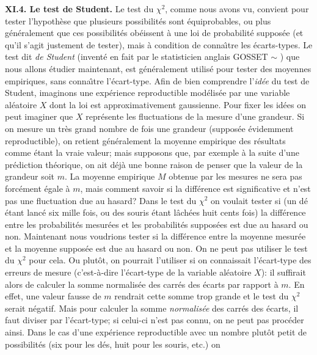 \bigskip

{\bf XI.4. Le test de Student.}
\medskip
Le test du $\chi^2$, comme nous avons vu, convient pour tester
l'hypoth\`ese que plusieurs possibilit\'es sont \'equiprobables, ou plus
g\'en\'eralement que ces possibilit\'es ob\'eissent \`a une loi de 
probabilit\'e suppos\'ee (et qu'il s'agit justement de tester), mais
\`a condition de conna{\^\i}tre les \'ecarts-types.
\medskip
Le test dit {\it de Student} (invent\'e en fait par le
statisticien anglais G{\eightrm OSSET} $\sim$ {}) que
nous allons \'etudier maintenant, est g\'en\'eralement utilis\'e pour 
tester des moyennes empiriques, sans conna{\^\i}tre l'\'ecart-type. 
\medskip
Afin de bien comprendre l'{\it id\'ee} du test de Student,
imaginons une exp\'erience reproductible mod\'elis\'ee par une
variable al\'eatoire $X$ dont la loi est approximativement gaussienne.
Pour fixer les id\'ees on peut imaginer que $X$ repr\'esente les
fluctuations de la mesure d'une grandeur. Si on mesure un tr\`es grand
nombre de fois une grandeur (suppos\'ee \'evidemment reproductible),
on retient g\'en\'eralement la moyenne empirique des r\'esultats comme 
\'etant la vraie valeur; mais supposons que, par exemple \`a la suite 
d'une pr\'ediction th\'eorique, on ait d\'ej\`a une bonne raison de penser
que la valeur de la grandeur soit $m$. La moyenne empirique $M$ obtenue
par les mesures ne sera pas forc\'ement \'egale \`a $m$, mais comment 
savoir si la diff\'erence est significative et n'est pas une fluctuation 
due au hasard? Dans le test du $\chi^2$ on voulait tester si (un d\'e
\'etant lanc\'e six mille fois, ou des souris \'etant l\^ach\'ees huit
cents fois) la diff\'erence entre les probabilit\'es mesur\'ees et les
probabilit\'es suppos\'ees est due au hasard ou non. Maintenant nous
voudrions tester si la diff\'erence entre la moyenne mesur\'ee et la
moyenne suppos\'ee est due au hasard ou non. On ne peut pas utiliser le
test du $\chi^2$ pour cela. Ou plut\^ot, on pourrait l'utiliser si on
connaissait l'\'ecart-type des erreurs de mesure (c'est-\`a-dire
l'\'ecart-type de la variable al\'eatoire $X$): il suffirait alors de
calculer la somme normalis\'ee des carr\'es des \'ecarts par rapport 
\`a $m$. En effet, une valeur fausse de $m$ rendrait cette somme trop
grande et le test du $\chi^2$ serait n\'egatif. Mais pour calculer la
somme {\it normalis\'ee} des carr\'es des \'ecarts, il faut diviser par
l'\'ecart-type; si celui-ci n'est pas connu, on ne peut pas proc\'eder
ainsi. 
\medskip
Dans le cas d'une exp\'erience reproductible avec un nombre plut\^ot 
petit de possibilit\'es (six pour les d\'es, huit pour les souris, etc.) on
